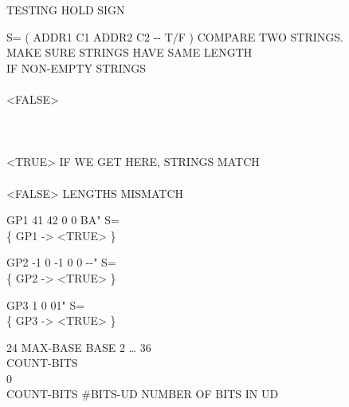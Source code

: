 \begin{tt}
TESTING     HOLD SIGN    

\word{:} S=   ( ADDR1 C1 ADDR2 C2 -{}- T/F ) COMPARE TWO STRINGS. \\
\tab	{}   \word{=} 	\tab[4.9]  MAKE SURE STRINGS HAVE SAME LENGTH \\
\tab[2]     				\tab[6]  IF NON-EMPTY STRINGS \\
  \\
\tab[4]           \word{-}
				  <FALSE>    \\
\tab[4]           \\
\tab[3]      \\
\tab[2]    \\
\tab[2]    <TRUE>								\tab[5.2]  IF WE GET HERE, STRINGS MATCH \\
\tab    {} \\
\tab[2]      <FALSE>		\tab {} LENGTHS MISMATCH \\
\tab    {} \word{;}

\word{:} GP1   41  42  0 0   BA" S= \word{;} \\
\{ GP1 -> <TRUE> \}

\word{:} GP2   -1  0  -1  0 0   -{}-" S= \word{;} \\
\{ GP2 -> <TRUE> \}

\word{:} GP3   1 0     01" S= \word{;} \\
\{ GP3 -> <TRUE> \}

24  MAX-BASE							\tab[6.2]  BASE 2 {\ldots} 36 \\
\word{:} COUNT-BITS \\
 0 
	       
	 \word{;} \\
COUNT-BITS   \#BITS-UD		\tab {} NUMBER OF BITS IN UD \\


\end{tt}
